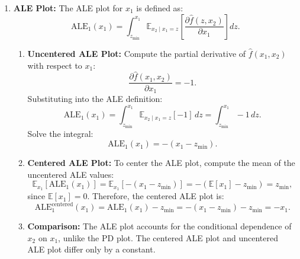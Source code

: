 {\begin{enumerate}
\item \textbf{ALE Plot:}
The ALE plot for \(x_1\) is defined as:
\[
\text{ALE}_1(x_1) = \int_{z_{\min}}^{x_1} \mathbb{E}_{x_2 \mid x_1 = z} \left[ \frac{\partial \hat{f}(z, x_2)}{\partial x_1} \right] dz.
\]
\begin{enumerate}
    \item \textbf{Uncentered ALE Plot:}
    Compute the partial derivative of \(\hat{f}(x_1, x_2)\) with respect to \(x_1\):
    \[
    \frac{\partial \hat{f}(x_1, x_2)}{\partial x_1} = -1.
    \]
    Substituting into the ALE definition:
    \[
    \text{ALE}_1(x_1) = \int_{z_{\min}}^{x_1} \mathbb{E}_{x_2 \mid x_1 = z}[-1] \, dz = \int_{z_{\min}}^{x_1} -1 \, dz.
    \]
    Solve the integral:
    \[
    \text{ALE}_1(x_1) = -(x_1 - z_{\min}).
    \]

    \item \textbf{Centered ALE Plot:}
    To center the ALE plot, compute the mean of the uncentered ALE values:
    \[
    \mathbb{E}_{x_1}[\text{ALE}_1(x_1)] = \mathbb{E}_{x_1}[-(x_1 - z_{\min})] = -( \mathbb{E}[x_1] - z_{\min}) = z_{\min},
    \]
    since \(\mathbb{E}[x_1] = 0\). Therefore, the centered ALE plot is:
    \[
    \text{ALE}_1^{\text{centered}}(x_1) = \text{ALE}_1(x_1) - z_{\min} = -(x_1 - z_{\min}) - z_{\min} = -x_1.
    \]

    \item \textbf{Comparison:}
    The ALE plot accounts for the conditional dependence of \(x_2\) on \(x_1\), unlike the PD plot.
    The centered ALE plot and uncentered ALE plot differ only by a constant.
\end{enumerate}

\end{enumerate}

}